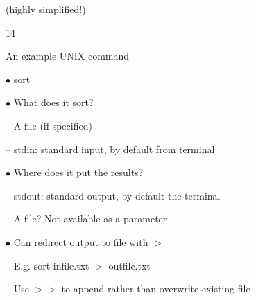 \documentclass[a4paper,portrait,12pt]{article}
\begin{document}
\begin{flushleft}
\newpage
\newpage
(highly simplified!)
\end{flushleft}





14





\begin{flushleft}
\newpage
An example UNIX command
\end{flushleft}


\begin{flushleft}
$\bullet$ sort
\end{flushleft}


\begin{flushleft}
$\bullet$ What does it sort?
\end{flushleft}


\begin{flushleft}
-- A file (if specified)
\end{flushleft}


\begin{flushleft}
-- stdin: standard input, by default from terminal
\end{flushleft}





\begin{flushleft}
$\bullet$ Where does it put the results?
\end{flushleft}


\begin{flushleft}
-- stdout: standard output, by default the terminal
\end{flushleft}


\begin{flushleft}
-- A file? Not available as a parameter
\end{flushleft}





\begin{flushleft}
$\bullet$ Can redirect output to file with $>$
\end{flushleft}


\begin{flushleft}
-- E.g. sort infile.txt $>$ outfile.txt
\end{flushleft}


\begin{flushleft}
-- Use $>$$>$ to append rather than overwrite existing file
\end{flushleft}
\end{document}

